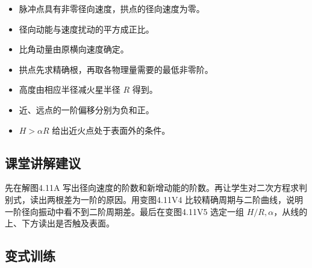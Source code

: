 \documentclass[UTF8,fontset=fandol,a4paper,11pt]{ctexart}
\begin{document}
\begin{itemize}
\item 脉冲点具有非零径向速度，拱点的径向速度为零。
\item 径向动能与速度扰动的平方成正比。
\item 比角动量由原横向速度确定。
\item 拱点先求精确根，再取各物理量需要的最低非零阶。
\item 高度由相应半径减火星半径 $R$ 得到。
\item 近、远点的一阶偏移分别为负和正。
\item $H>\alpha R$ 给出近火点处于表面外的条件。
\end{itemize}



\subsection*{课堂讲解建议}

先在解图4.11A 写出径向速度的阶数和新增动能的阶数。再让学生对二次方程求判别式，读出两根差为一阶的原因。用变图4.11V4 比较精确周期与二阶曲线，说明一阶径向振动中看不到二阶周期差。最后在变图4.11V5 选定一组 $H/R,\alpha$，从线的上、下方读出是否触及表面。



\subsection*{变式训练}
\end{document}
